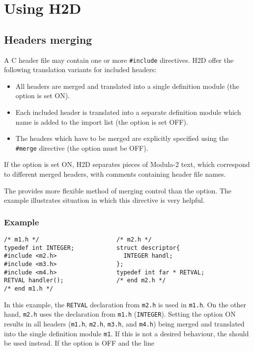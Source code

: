\chapter{Using H2D}
\label{using}

\section{Headers merging} %
\label{using:merge}

A C header file may contain one or more {\tt \#include} directives.
H2D offer the following translation variants for included headers:

\begin{itemize}
\item All headers are merged and translated into a single definition module
      (the  option is set ON).
\item Each included header is translated into a separate definition module
      which name is added to the import list (the 
      option is set OFF).
\item The headers which have to be merged are explicitly specified using the
      {\tt \#merge} directive (the  option must be OFF).
\end{itemize}

If the  option is set ON, H2D separates pieces of Modula-2
text, which correspond to different merged headers, with comments containing header
file names.

The  provides more flexible method of merging control
than the  option. The example illustrates situation in which
this directive is very helpful.

\subsection*{Example}

\begin{verbatim}
/* m1.h */                      /* m2.h */
typedef int INTEGER;            struct descriptor{
#include <m2.h>                   INTEGER handl;
#include <m3.h>                 };
#include <m4.h>                 typedef int far * RETVAL;
RETVAL handler();               /* end m2.h */
/* end m1.h */
\end{verbatim}

In this example, the {\tt RETVAL} declaration from {\tt m2.h} is used in
{\tt m1.h}. On the other hand, {\tt m2.h} uses the declaration from {\tt m1.h}
({\tt INTEGER}). Setting the  option ON
results in all headers ({\tt m1.h}, {\tt m2.h},
{\tt m3.h}, and {\tt m4.h}) being merged and translated into the single
definition module {\tt m1}. If this is not a desired behaviour,
the  should be used instead. If the 
option is OFF and the line

